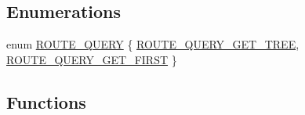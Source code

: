\subsection*{Enumerations}
\begin{DoxyCompactItemize}
\item 
enum \hyperlink{route-tree_8c_aed8cdbb52dbe32c343a8c26887888e7f}{R\+O\+U\+T\+E\+\_\+\+Q\+U\+E\+RY} \{ \hyperlink{route-tree_8c_aed8cdbb52dbe32c343a8c26887888e7fab02d9a33d5a8476efc87ecc7049cc120}{R\+O\+U\+T\+E\+\_\+\+Q\+U\+E\+R\+Y\+\_\+\+G\+E\+T\+\_\+\+T\+R\+EE}, 
\hyperlink{route-tree_8c_aed8cdbb52dbe32c343a8c26887888e7fae1f920d24672bfd2b4deee446627d969}{R\+O\+U\+T\+E\+\_\+\+Q\+U\+E\+R\+Y\+\_\+\+G\+E\+T\+\_\+\+F\+I\+R\+ST}
 \}
\end{DoxyCompactItemize}
\subsection*{Functions}
